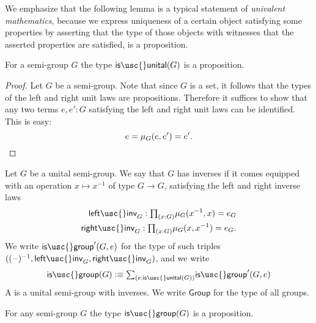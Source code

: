 We emphasize that the following lemma is a typical statement of \emph{univalent mathematics}, because we express uniqueness of a certain object satisfying some properties by asserting that the type of those objects with witnesses that the asserted properties are satisfied, is a proposition.

\begin{lem}
  For a semi-group $G$ the type $\mathsf{is\usc{}unital}(G)$ is a proposition.
\end{lem}

\begin{proof}
  Let $G$ be a semi-group. Note that since $G$ is a set, it follows that the types of the left and right unit laws are propositions. Therefore it suffices to show that any two terms $e,e':G$ satisfying the left and right unit laws can be identified. This is easy:
  \begin{equation*}
    e = \mu_G(e,e') = e'.\qedhere
  \end{equation*}
\end{proof}

\begin{defn}
  Let $G$ be a unital semi-group. We say that $G$ has inverses if it comes equipped with an operation $x\mapsto x^{-1}$ of type $G\to G$, satisfying the left and right inverse laws
  \begin{align*}
    \mathsf{left\usc{}inv}_G : \prd{x:G}\mu_G(x^{-1},x)=e_G \\
    \mathsf{right\usc{}inv}_G : \prd{x:G}\mu_G(x,x^{-1}) = e_G.
  \end{align*}
  We write $\mathsf{is\usc{}group}'(G,e)$ for the type of such triples $((\blank)^{-1},\mathsf{left\usc{}inv}_G,\mathsf{right\usc{}inv}_G)$, and we write
  \begin{equation*}
    \mathsf{is\usc{}group}(G)\defeq\sm{e:\mathsf{is\usc{}unital}(G)}\mathsf{is\usc{}group}'(G,e)
  \end{equation*}
  A  is a unital semi-group with inverses. We write $\mathsf{Group}$ for the type of all groups.
\end{defn}

\begin{lem}
  For any semi-group $G$ the type $\mathsf{is\usc{}group}(G)$ is a proposition.
\end{lem}

